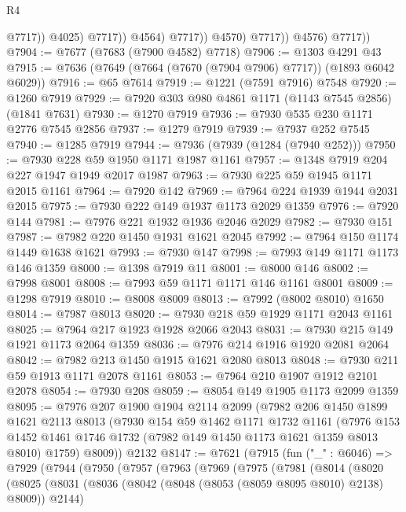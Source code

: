 \begin{lexlean}{R4}
\begin{coremodule}
                                @7717))
                            @4025)
                          @7717))
                      @4564)
                    @7717))
                @4570)
              @7717))
          @4576)
        @7717))
@7904 := @7677 (@7683 (@7900 @4582) @7718)
@7906 := @1303 @4291 @43
@7915 := @7636 (@7649 (@7664 (@7670 (@7904 @7906) @7717)) (@1893 @6042 @6029))
@7916 := @65 @7614
@7919 := @1221 (@7591 @7916) @7548
@7920 := @1260 @7919
@7929 := @7920 @303 @980 @4861 @1171 (@1143 @7545 @2856) (@1841 @7631)
@7930 := @1270 @7919
@7936 := @7930 @535 @230 @1171 @2776 @7545 @2856
@7937 := @1279 @7919
@7939 := @7937 @252 @7545
@7940 := @1285 @7919
@7944 := @7936 (@7939 (@1284 (@7940 @252)))
@7950 := @7930 @228 @59 @1950 @1171 @1987 @1161
@7957 := @1348 @7919 @204 @227 @1947 @1949 @2017 @1987
@7963 := @7930 @225 @59 @1945 @1171 @2015 @1161
@7964 := @7920 @142
@7969 := @7964 @224 @1939 @1944 @2031 @2015
@7975 := @7930 @222 @149 @1937 @1173 @2029 @1359
@7976 := @7920 @144
@7981 := @7976 @221 @1932 @1936 @2046 @2029
@7982 := @7930 @151
@7987 := @7982 @220 @1450 @1931 @1621 @2045
@7992 := @7964 @150 @1174 @1449 @1638 @1621
@7993 := @7930 @147
@7998 := @7993 @149 @1171 @1173 @146 @1359
@8000 := @1398 @7919 @11
@8001 := @8000 @146
@8002 := @7998 @8001
@8008 := @7993 @59 @1171 @1171 @146 @1161 @8001
@8009 := @1298 @7919
@8010 := @8008 @8009
@8013 := @7992 (@8002 @8010) @1650
@8014 := @7987 @8013
@8020 := @7930 @218 @59 @1929 @1171 @2043 @1161
@8025 := @7964 @217 @1923 @1928 @2066 @2043
@8031 := @7930 @215 @149 @1921 @1173 @2064 @1359
@8036 := @7976 @214 @1916 @1920 @2081 @2064
@8042 := @7982 @213 @1450 @1915 @1621 @2080 @8013
@8048 := @7930 @211 @59 @1913 @1171 @2078 @1161
@8053 := @7964 @210 @1907 @1912 @2101 @2078
@8054 := @7930 @208
@8059 := @8054 @149 @1905 @1173 @2099 @1359
@8095 := @7976
    @207
    @1900
    @1904
    @2114
    @2099
    (@7982
      @206
      @1450
      @1899
      @1621
      @2113
      @8013
      (@7930
        @154
        @59
        @1462
        @1171
        @1732
        @1161
        (@7976 @153 @1452 @1461 @1746 @1732 (@7982 @149 @1450 @1173 @1621 @1359 @8013 @8010) @1759)
        @8009))
    @2132
@8147 := @7621
    (@7915
      (fun ("_" : @6046) =>
      @7929
        (@7944
          (@7950
            (@7957
              (@7963
                (@7969
                  (@7975
                    (@7981
                      (@8014
                        (@8020
                          (@8025
                            (@8031
                              (@8036 (@8042 (@8048 (@8053 (@8059 @8095 @8010) @2138) @8009)) @2144)

\end{coremodule}
\end{lexlean}
